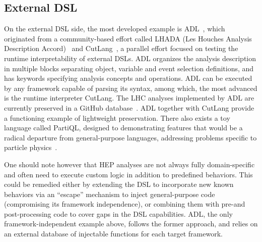\documentclass[11pt]{article}
\begin{document}
\begin{appendices}
    \subsection{External DSL}
    On the external \gls{DSL} side, the most developed example is \gls{ADL}~\cite{adlweb, Unel:2021edl}, which originated from a community-based effort called LHADA (Les Houches Analysis Description Accord)~\cite{Brooijmans:2016vro} and CutLang~\cite{Sekmen:2018ehb}, a parallel effort focused on testing the runtime interpretability of external \glspl{DSL}. \gls{ADL} organizes the analysis description in multiple blocks separating object, variable and event selection definitions, and has keywords specifying analysis concepts and operations. 
    \gls{ADL} can be executed by any framework capable of parsing its syntax, among which, the most advanced is the runtime interpreter CutLang. The \gls{LHC} analyses implemented by \gls{ADL} are currently preserved in a GitHub database~\cite{adllhcanl}. \gls{ADL} together with CutLang provide a functioning example of lightweight preservation. There also exists a toy language called PartiQL, designed to demonstrating features that would be a radical departure from general-purpose languages, addressing problems specific to particle physics~\cite{PartiQL}. 
    
    One should note however that \gls{HEP} analyses are not always fully domain-specific and often need to execute custom logic in addition to predefined behaviors. This could be remedied either by extending the \gls{DSL} to incorporate new known behaviors via an ``escape'' mechanism to inject general-purpose code (compromising its framework independence), or combining them with pre-and post-processing code to cover gaps in the \gls{DSL} capabilities. \gls{ADL}, the only framework-independent example above, follows the former approach, and relies on an external database of injectable functions for each target framework.

\end{appendices}
\end{document}
